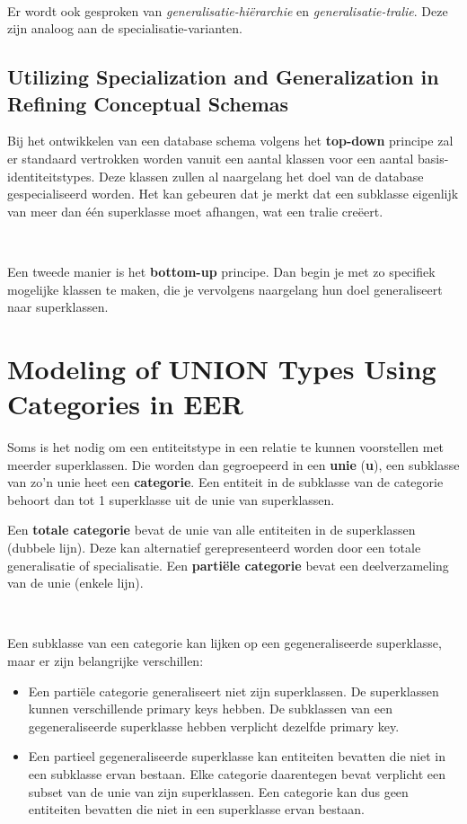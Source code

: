 ~

\noindent Er wordt ook gesproken van \textit{generalisatie-hi\"erarchie} en \textit{generalisatie-tralie}. Deze zijn analoog aan de specialisatie-varianten.

\subsection{Utilizing Specialization and Generalization in Refining Conceptual Schemas}
Bij het ontwikkelen van een database schema volgens het \textbf{top-down} principe zal er standaard vertrokken worden vanuit een aantal klassen voor een aantal basis-identiteitstypes. Deze klassen zullen al naargelang het doel van de database gespecialiseerd worden. Het kan gebeuren dat je merkt dat een subklasse eigenlijk van meer dan \'e\'en superklasse moet afhangen, wat een tralie cre\"eert.

~

\noindent Een tweede manier is het \textbf{bottom-up} principe. Dan begin je met zo specifiek mogelijke klassen te maken, die je vervolgens naargelang hun doel generaliseert naar superklassen.


\section{Modeling of UNION Types Using Categories in EER}
Soms is het nodig om een entiteitstype in een relatie te kunnen voorstellen met meerder superklassen. Die worden dan gegroepeerd in een \textbf{unie} (\textbf{u}), een subklasse van zo'n unie heet een \textbf{categorie}. Een entiteit in de subklasse van de categorie behoort dan tot 1 superklasse uit de unie van superklassen.

Een \textbf{totale categorie} bevat de unie van alle entiteiten in de superklassen (dubbele lijn). Deze kan alternatief gerepresenteerd worden door een totale generalisatie of specialisatie. Een \textbf{parti\"ele categorie} bevat een deelverzameling van de unie (enkele lijn).

~

\noindent Een subklasse van een categorie kan lijken op een gegeneraliseerde superklasse, maar er zijn belangrijke verschillen:
\begin{itemize}
\item Een parti\"ele categorie generaliseert niet zijn superklassen. De superklassen kunnen verschillende primary keys hebben. De subklassen van een gegeneraliseerde superklasse hebben verplicht dezelfde primary key.
\item Een partieel gegeneraliseerde superklasse kan entiteiten bevatten die niet in een subklasse ervan bestaan. Elke categorie daarentegen bevat verplicht een subset van de unie van zijn superklassen. Een categorie kan dus geen entiteiten bevatten die niet in een superklasse ervan bestaan.
\end{itemize}

